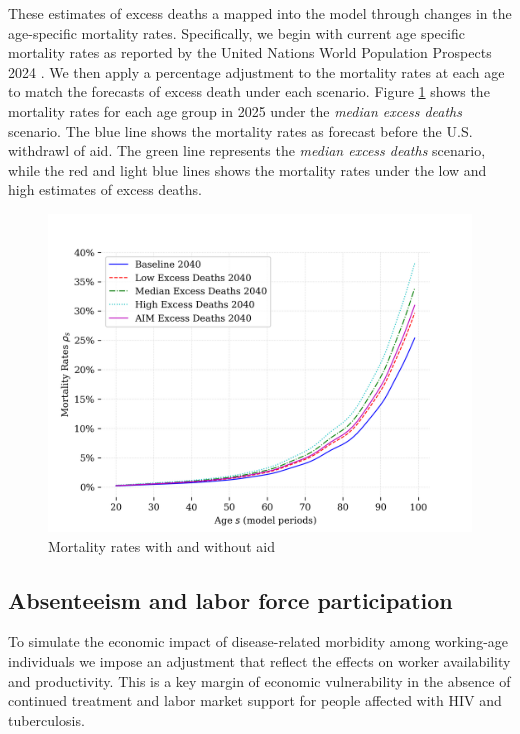 \documentclass[letterpaper,12pt]{article}
\theoremstyle{definition}
\begin{document}
\begin{spacing}{1.5}
These estimates of excess deaths a mapped into the model through changes in the age-specific mortality rates.  Specifically, we begin with current age specific mortality rates as reported by the United Nations World Population Prospects 2024 \citep{UN2024}. We then apply a percentage adjustment to the mortality rates at each age to match the forecasts of excess death under each scenario. Figure \ref{fig:Mortality} shows the mortality rates for each age group in 2025 under the \textit{median excess deaths} scenario. The blue line shows the mortality rates as forecast before the U.S. withdrawl of aid.  The green line represents the \textit{median excess deaths} scenario, while the red and light blue lines shows the mortality rates under the low and high estimates of excess deaths.


\begin{figure}[H]
    \caption{Mortality rates with and without aid}
    \label{fig:Mortality}
    \centering
    \includegraphics[scale=0.75]{./tables_figures/mortality_rates.png}
\end{figure}





\subsection{Absenteeism and labor force participation}
To simulate the economic impact of disease-related morbidity among working-age individuals we impose an adjustment that reflect the effects on worker availability and productivity. This is a key margin of economic vulnerability in the absence of continued treatment and labor market support for people affected with HIV and tuberculosis.


\end{spacing}
\end{document}
